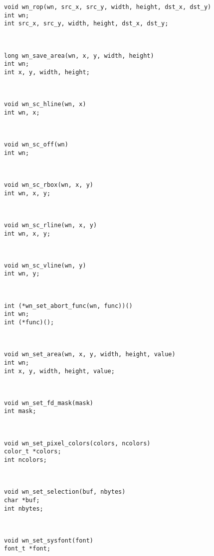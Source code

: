 \parbox[t]{5in}{\tt void wn\_rop(wn, src\_x, src\_y, width, height, dst\_x, dst\_y)\\int wn;\\int src\_x, src\_y, width, height, dst\_x, dst\_y;}\> \pageref{wn_rop}\\[0.1in]
\parbox[t]{5in}{\tt long wn\_save\_area(wn, x, y, width, height)\\int wn;\\int x, y, width, height;}\> \pageref{wn_save_area}\\[0.1in]
\parbox[t]{5in}{\tt void wn\_sc\_hline(wn, x)\\int wn, x;}\> \pageref{wn_sc_hline}\\[0.1in]
\parbox[t]{5in}{\tt void wn\_sc\_off(wn)\\int wn;}\> \pageref{wn_sc_off}\\[0.1in]
\parbox[t]{5in}{\tt void wn\_sc\_rbox(wn, x, y)\\int wn, x, y;}\> \pageref{wn_sc_rbox}\\[0.1in]
\parbox[t]{5in}{\tt void wn\_sc\_rline(wn, x, y)\\int wn, x, y;}\> \pageref{wn_sc_rline}\\[0.1in]
\parbox[t]{5in}{\tt void wn\_sc\_vline(wn, y)\\int wn, y;}\> \pageref{wn_sc_vline}\\[0.1in]
\parbox[t]{5in}{\tt int (*wn\_set\_abort\_func(wn, func))()\\int wn;\\int (*func)();}\> \pageref{wn_set_abort_func}\\[0.1in]
\parbox[t]{5in}{\tt void wn\_set\_area(wn, x, y, width, height, value)\\int wn;\\int x, y, width, height, value;}\> \pageref{wn_set_area}\\[0.1in]
\parbox[t]{5in}{\tt void wn\_set\_fd\_mask(mask)\\int mask;}\> \pageref{wn_set_fd_mask}\\[0.1in]
\parbox[t]{5in}{\tt void wn\_set\_pixel\_colors(colors, ncolors)\\color\_t *colors;\\int ncolors;}\> \pageref{wn_set_pixel_colors}\\[0.1in]
\parbox[t]{5in}{\tt void wn\_set\_selection(buf, nbytes)\\char *buf;\\int nbytes;}\> \pageref{wn_set_selection}\\[0.1in]
\parbox[t]{5in}{\tt void wn\_set\_sysfont(font)\\font\_t *font;}\> \pageref{wn_set_sysfont}\\[0.1in]
